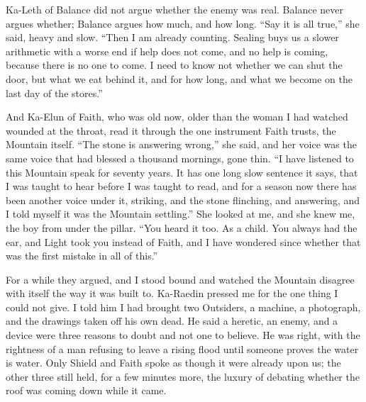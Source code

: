 Ka-Leth of Balance did not argue whether the enemy was real. Balance never argues whether; Balance argues how much, and how long. ``Say it is all true,'' she said, heavy and slow. ``Then I am already counting. Sealing buys us a slower arithmetic with a worse end if help does not come, and no help is coming, because there is no one to come. I need to know not whether we can shut the door, but what we eat behind it, and for how long, and what we become on the last day of the stores.''\par

And Ka-Elun of Faith, who was old now, older than the woman I had watched wounded at the throat, read it through the one instrument Faith trusts, the Mountain itself. ``The stone is answering wrong,'' she said, and her voice was the same voice that had blessed a thousand mornings, gone thin. ``I have listened to this Mountain speak for seventy years. It has one long slow sentence it says, that I was taught to hear before I was taught to read, and for a season now there has been another voice under it, striking, and the stone flinching, and answering, and I told myself it was the Mountain settling.'' She looked at me, and she knew me, the boy from under the pillar. ``You heard it too. As a child. You always had the ear, and Light took you instead of Faith, and I have wondered since whether that was the first mistake in all of this.''\par

For a while they argued, and I stood bound and watched the Mountain disagree with itself the way it was built to. Ka-Raedin pressed me for the one thing I could not give. I told him I had brought two Outsiders, a machine, a photograph, and the drawings taken off his own dead. He said a heretic, an enemy, and a device were three reasons to doubt and not one to believe. He was right, with the rightness of a man refusing to leave a rising flood until someone proves the water is water. Only Shield and Faith spoke as though it were already upon us; the other three still held, for a few minutes more, the luxury of debating whether the roof was coming down while it came.\par

